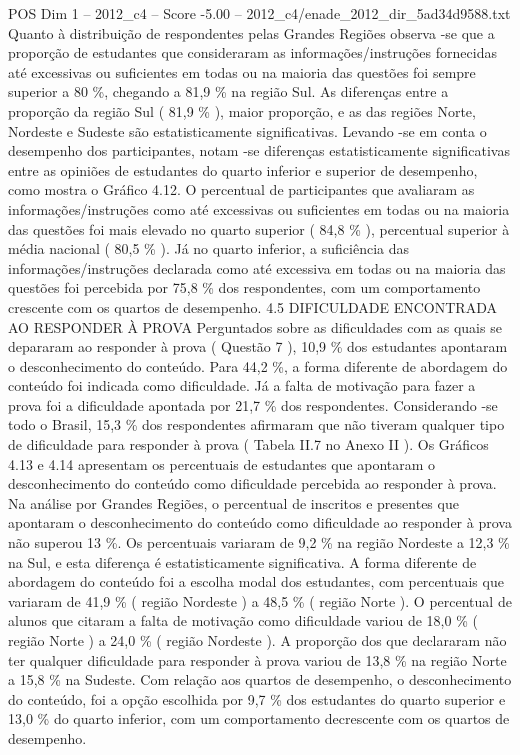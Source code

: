 \begin{textsample}{POS Dim 1 – 2012\_c4 – Score -5.00 – 2012\_c4/enade\_2012\_dir\_5ad34d9588.txt}
Quanto à distribuição de respondentes pelas Grandes Regiões observa -se que a proporção de estudantes que consideraram as informações/instruções fornecidas até excessivas ou suficientes em todas ou na maioria das questões foi sempre superior a 80 \%, chegando a 81,9 \% na região Sul.
As diferenças entre a proporção da região Sul ( 81,9 \% ), maior proporção, e as das regiões Norte, Nordeste e Sudeste são estatisticamente significativas.
Levando -se em conta o desempenho dos participantes, notam -se diferenças estatisticamente significativas entre as opiniões de estudantes do quarto inferior e superior de desempenho, como mostra o Gráfico 4.12.
O percentual de participantes que avaliaram as informações/instruções como até excessivas ou suficientes em todas ou na maioria das questões foi mais elevado no quarto superior ( 84,8 \% ), percentual superior à média nacional ( 80,5 \% ).
Já no quarto inferior, a suficiência das informações/instruções declarada como até excessiva em todas ou na maioria das questões foi percebida por 75,8 \% dos respondentes, com um comportamento crescente com os quartos de desempenho. 4.5 DIFICULDADE ENCONTRADA AO RESPONDER À PROVA Perguntados sobre as dificuldades com as quais se depararam ao responder à prova ( Questão 7 ), 10,9 \% dos estudantes apontaram o desconhecimento do conteúdo.
Para 44,2 \%, a forma diferente de abordagem do conteúdo foi indicada como dificuldade.
Já a falta de motivação para fazer a prova foi a dificuldade apontada por 21,7 \% dos respondentes.
Considerando -se todo o Brasil, 15,3 \% dos respondentes afirmaram que não tiveram qualquer tipo de dificuldade para responder à prova ( Tabela II.7 no Anexo II ).
Os Gráficos 4.13 e 4.14 apresentam os percentuais de estudantes que apontaram o desconhecimento do conteúdo como dificuldade percebida ao responder à prova.
Na análise por Grandes Regiões, o percentual de inscritos e presentes que apontaram o desconhecimento do conteúdo como dificuldade ao responder à prova não superou 13 \%.
Os percentuais variaram de 9,2 \% na região Nordeste a 12,3 \% na Sul, e esta diferença é estatisticamente significativa.
A forma diferente de abordagem do conteúdo foi a escolha modal dos estudantes, com percentuais que variaram de 41,9 \% ( região Nordeste ) a 48,5 \% ( região Norte ).
O percentual de alunos que citaram a falta de motivação como dificuldade variou de 18,0 \% ( região Norte ) a 24,0 \% ( região Nordeste ).
A proporção dos que declararam não ter qualquer dificuldade para responder à prova variou de 13,8 \% na região Norte a 15,8 \% na Sudeste.
Com relação aos quartos de desempenho, o desconhecimento do conteúdo, foi a opção escolhida por 9,7 \% dos estudantes do quarto superior e 13,0 \% do quarto inferior, com um comportamento decrescente com os quartos de desempenho.

\end{textsample}
